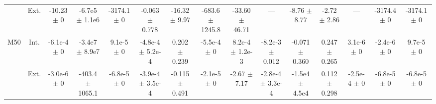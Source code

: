 \begin{table}[htbp]
{\begin{tabular}{@{}ccccccccccccccc@{}}
 & Ext. & -10.23 $\pm$ 0 & -6.7e5 $\pm$ 1.1e6 & -3174.1 $\pm$ 0 & -0.063 $\pm$ 0.778 & -16.32 $\pm$ 9.97 & -683.6 $\pm$ 1245.8 & -33.60 $\pm$ 46.71 & --- & -8.76 $\pm$ 8.77 & -2.72 $\pm$ 2.86 & --- & -3174.4 $\pm$ 0 & -3174.1 $\pm$ 0 \\
\cline{2-15}
\multirow{2}{*}{M50} & Int. & -6.1e-4 $\pm$ 0 & -3.4e7 $\pm$ 8.9e7 & 9.1e-5 $\pm$ 0 & -4.8e-4 $\pm$ 5.2e-4 & 0.202 $\pm$ 0.239 & -5.5e-4 $\pm$ 0 & 8.2e-4 $\pm$ 1.2e-3 & -8.2e-3 $\pm$ 0.012 & -0.071 $\pm$ 0.360 & 0.247 $\pm$ 0.265 & 3.1e-6 $\pm$ 0 & -2.4e-6 $\pm$ 0 & 9.7e-5 $\pm$ 0 \\
 & Ext. & -3.0e-6 $\pm$ 0 & -403.4 $\pm$ 1065.1 & -6.8e-5 $\pm$ 0 & -3.9e-4 $\pm$ 3.5e-4 & -0.115 $\pm$ 0.491 & -2.1e-5 $\pm$ 0 & -2.67 $\pm$ 7.17 & -2.8e-4 $\pm$ 3.3e-4 & -1.5e4 $\pm$ 4.5e4 & 0.112 $\pm$ 0.298 & -2.5e-4 $\pm$ 0 & -6.8e-5 $\pm$ 0 & -6.8e-5 $\pm$ 0 \\
\bottomrule
\end{tabular}
}
\end{table}